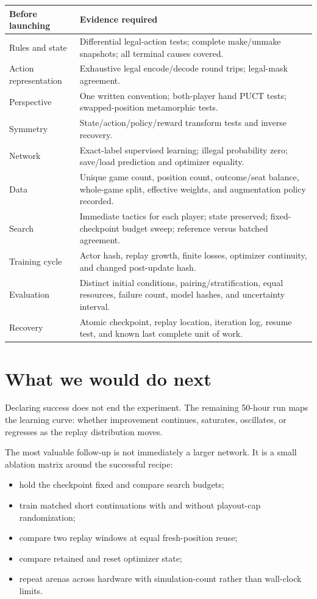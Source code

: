 \documentclass[10.5pt,letterpaper]{article}
\begin{document}
\begin{center}
\small
\begin{tabularx}{\textwidth}{L{0.28\textwidth} Y}
\toprule
\sffamily\bfseries Before launching &
\sffamily\bfseries Evidence required \\
\midrule
Rules and state &
Differential legal-action tests; complete make/unmake snapshots; all terminal
causes covered. \\
Action representation &
Exhaustive legal encode/decode round trips; legal-mask agreement. \\
Perspective &
One written convention; both-player hand PUCT tests; swapped-position
metamorphic tests. \\
Symmetry &
State/action/policy/reward transform tests and inverse recovery. \\
Network &
Exact-label supervised learning; illegal probability zero; save/load prediction
and optimizer equality. \\
Data &
Unique game count, position count, outcome/seat balance, whole-game split,
effective weights, and augmentation policy recorded. \\
Search &
Immediate tactics for each player; state preserved; fixed-checkpoint budget
sweep; reference versus batched agreement. \\
Training cycle &
Actor hash, replay growth, finite losses, optimizer continuity, and changed
post-update hash. \\
Evaluation &
Distinct initial conditions, pairing/stratification, equal resources, failure
count, model hashes, and uncertainty interval. \\
Recovery &
Atomic checkpoint, replay location, iteration log, resume test, and known last
complete unit of work. \\
\bottomrule
\end{tabularx}
\end{center}

\section{What we would do next}

Declaring success does not end the experiment. The remaining 50-hour run maps
the learning curve: whether improvement continues, saturates, oscillates, or
regresses as the replay distribution moves.

The most valuable follow-up is not immediately a larger network. It is a small
ablation matrix around the successful recipe:
\begin{itemize}
  \item hold the checkpoint fixed and compare search budgets;
  \item train matched short continuations with and without playout-cap
        randomization;
  \item compare two replay windows at equal fresh-position reuse;
  \item compare retained and reset optimizer state;
  \item repeat arenas across hardware with simulation-count rather than
        wall-clock limits.
\end{itemize}
\end{document}
